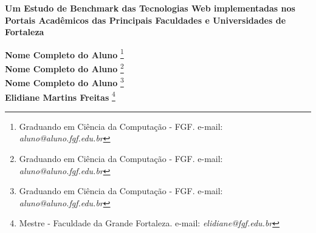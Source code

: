 \documentclass[12pt]{article}
\begin{document}

%



\begin{center}
\textbf{\Large{Um Estudo de Benchmark das Tecnologias Web implementadas nos Portais Acadêmicos das Principais Faculdades e Universidades de Fortaleza}}\\
\end{center}

\vspace*{0.2cm}

\begin{flushright}
 {\bf Nome Completo do Aluno} \footnote[1]{Graduando em Ciência da Computação - FGF. e-mail: \it aluno@aluno.fgf.edu.br}  \\
 {\bf Nome Completo do Aluno} \footnote[2]{Graduando em Ciência da Computação - FGF. e-mail: \it aluno@aluno.fgf.edu.br}  \\
  {\bf Nome Completo do Aluno} \footnote[3]{Graduando em Ciência da Computação - FGF. e-mail: \it aluno@aluno.fgf.edu.br}  \\
   {\bf Elidiane Martins Freitas} \footnote[4]{Mestre - Faculdade da Grande Fortaleza. e-mail: \it elidiane@fgf.edu.br}   \\
\end{flushright}

\vspace*{0.5cm}

\end{document}
